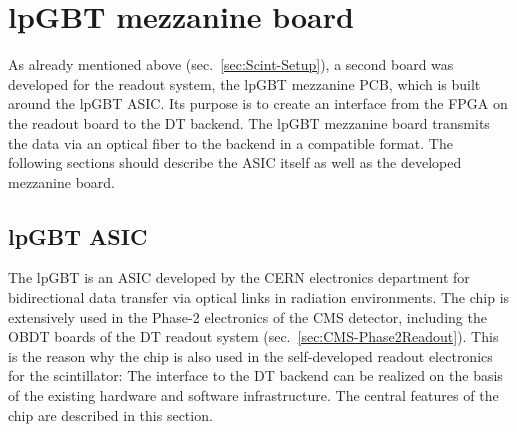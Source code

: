 \section{lpGBT mezzanine board}
\label{sec:Scint-lpGBTMezzanine}
As already mentioned above (sec.\ \ref{sec:Scint-Setup}), a second board was developed for the readout system, the \ac{lpGBT} mezzanine \ac{PCB}, which is built around the \ac{lpGBT} \ac{ASIC}. Its purpose is to create an interface from the \ac{FPGA} on the readout board to the \ac{DT} backend. The \ac{lpGBT} mezzanine board transmits the data via an optical fiber to the backend in a compatible format. The following sections should describe the \ac{ASIC} itself as well as the developed mezzanine board.

\subsection{lpGBT ASIC}
\label{sec:Scint-lpGBTMezzanine-lpGBT}
The \acf{lpGBT} \cite{lpGBT-Main} is an \ac{ASIC} developed by the \ac{CERN} electronics department for bidirectional data transfer via optical links in radiation environments. The chip is extensively used in the Phase-2 electronics of the \ac{CMS} detector, including the \ac{OBDT} boards of the \ac{DT} readout system (sec.\ \ref{sec:CMS-Phase2Readout}). This is the reason why the chip is also used in the self-developed readout electronics for the scintillator: The interface to the \ac{DT} backend can be realized on the basis of the existing hardware and software infrastructure. The central features of the chip are described in this section.

